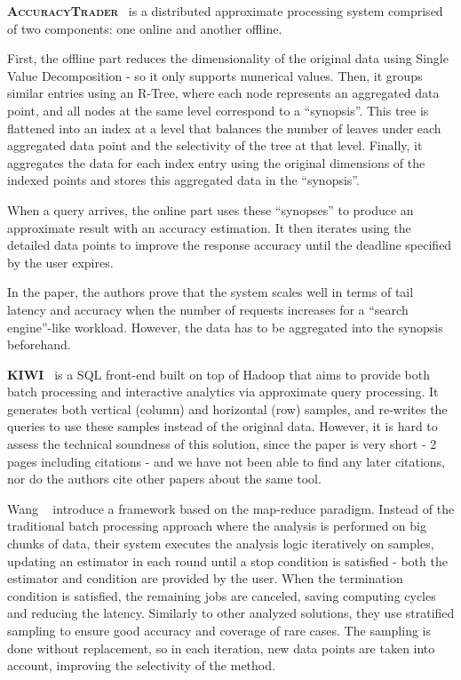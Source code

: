 \textbf{\textsc{AccuracyTrader}}~\cite{Han2016} is a distributed approximate processing 
system comprised of two components: one online and another offline.

First, the offline part reduces the dimensionality of the original data using 
Single Value Decomposition - so it only supports numerical values. 
Then, it groups similar entries using an R-Tree, where each node represents an 
aggregated data point, and all nodes at the same level correspond to a 
``synopsis''. This tree is flattened into an index at a level that balances 
the number of leaves under each aggregated data point and the 
selectivity of the tree at that level. Finally, it aggregates the data for 
each index entry using the original dimensions of the indexed points and stores 
this aggregated data in the ``synopsis''.

When a query arrives, the online part uses these ``synopses'' to produce 
an approximate result with an accuracy estimation. It then iterates 
using the detailed data points to improve the response accuracy until the
deadline specified by the user expires.

In the paper, the authors prove that the system scales well in terms 
of tail latency and accuracy when the number of requests increases for a 
``search engine''-like workload. However, the data has to be aggregated into 
the synopsis beforehand.

\medskip

\textbf{\textsc{KIWI}}~\cite{Kim2015} is a SQL front-end built on top of Hadoop that aims 
to provide both batch processing and interactive analytics via approximate
query processing. It generates both vertical (column) and horizontal (row) 
samples, and re-writes the queries to use these samples instead of the original 
data. However, it is hard to assess the technical soundness of this 
solution, since the paper is very short - 2 pages including citations -
and we have not been able to find any later citations, nor do the authors cite 
other papers about the same tool.

\medskip

Wang \etal~\cite{WangYi2015} introduce a framework based on the 
map-reduce paradigm. Instead of the traditional batch processing approach 
where the analysis is performed on big chunks of data, their system executes the 
analysis logic iteratively on samples, updating an estimator in each round 
until a stop condition is satisfied - both the estimator and condition are provided by 
the user. When the termination condition is satisfied, the remaining jobs are 
canceled, saving computing cycles and reducing the latency. Similarly to other 
analyzed solutions, they use stratified sampling to ensure good accuracy and 
coverage of rare cases. 
The sampling is done without replacement, so in each iteration, new data points 
are taken into account, improving the selectivity of the method.

